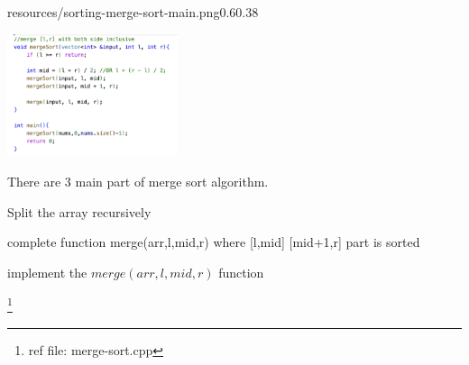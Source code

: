  \vspace{1.7cm} 
 \begin{lfigure}{resources/sorting-merge-sort-main.png}{0.6}{0.38}

     
     \includegraphics[width=5cm]{resources/sorting-merge-sort-base.png}

     There are 3 main part of merge sort algorithm.
     \begin{compactenum}
          \item  Split the array recursively 
          \item complete function merge(arr,l,mid,r) where [l,mid] [mid+1,r] part is sorted
          \item implement the $merge(arr,l,mid,r)$ function 
     \end{compactenum}
     \footnote{ref file: merge-sort.cpp}
 \end{lfigure}

 




\begin{exercise}

     \begin{compactenum}
          \item 
     \end{compactenum}

     
\end{exercise}



